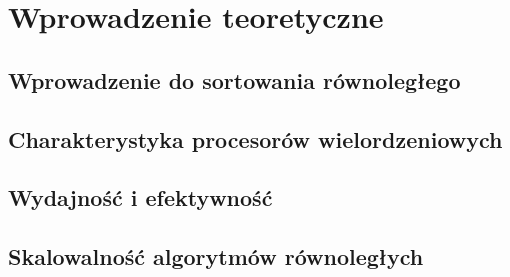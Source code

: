 \cleardoublepage
\chapter{Wprowadzenie teoretyczne}
\label{cha:RozdzialWprowadzajacy}


\section{Wprowadzenie do sortowania równoległego}
\label{sec:SortowanieRownolegle}



\section{Charakterystyka procesorów wielordzeniowych}
\label{sec:ProcesoryWielordzeniowe}



\section{Wydajność i efektywność}
\label{sec:WydajnoscEfektywnosc}



\section{Skalowalność algorytmów równoległych}
\label{sec:SkalowalnoscAlgorytmow}

